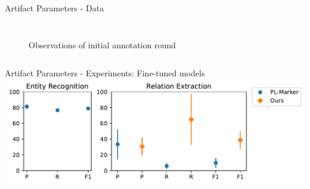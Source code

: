 \documentclass[en,16:9,smallfoot]{sdqbeamer}
\begin{document}
\begin{frame}{Artifact Parameters - Data}
\begin{columns}
\begin{figure}
{                }
                \caption{Observations of initial annotation round}
                \label{fig:init-annot}
            \end{figure}
   \end{columns}
   \end{frame}


   \begin{frame}{Artifact Parameters - Experiments: Fine-tuned models}
           \centering\includegraphics[width=0.7\linewidth]{imgs/fine_tuned_eval}
   \end{frame}
\end{document}
